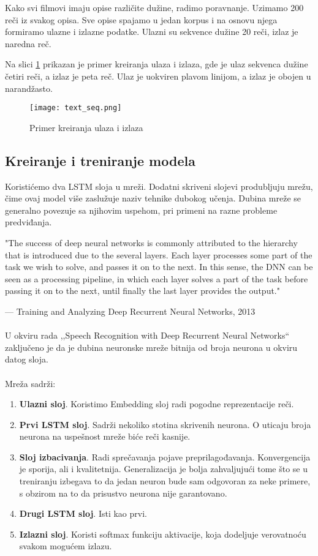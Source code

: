 \documentclass[a4paper]{article}
\begin{document}
Kako svi filmovi imaju opise različite dužine, radimo poravnanje. Uzimamo 200 reči iz svakog opisa. Sve opise spajamo u jedan korpus i na osnovu njega formiramo ulazne i izlazne podatke. Ulazni su sekvence dužine 20 reči, izlaz je naredna reč.

Na slici \ref{fig:text_seq} prikazan je primer kreiranja ulaza i izlaza, gde je ulaz sekvenca dužine četiri reči, a izlaz je peta reč. Ulaz je uokviren plavom linijom, a izlaz je obojen u narandžasto.


\begin{figure}[htp]
    \centering
    \texttt{[image: text\_seq.png]}
    \caption{Primer kreiranja ulaza i izlaza}
    \label{fig:text_seq}
\end{figure}



\subsection{Kreiranje i treniranje modela}

Koristićemo dva LSTM sloja u mreži. Dodatni skriveni slojevi produbljuju mrežu, čime ovaj model više zaslužuje naziv tehnike dubokog učenja. Dubina mreže se generalno povezuje sa njihovim uspehom, pri primeni na razne probleme predviđanja. 

"The success of deep neural networks is commonly attributed to the hierarchy that is introduced due to the several layers. Each layer processes some part of the task we wish to solve, and passes it on to the next. In this sense, the DNN can be seen as a processing pipeline, in which each layer solves a part of the task before passing it on to the next, until finally the last layer provides the output."

— Training and Analyzing Deep Recurrent Neural Networks, 2013  \cite{NIPS2013_5166}\\
\\
U okviru rada ,,Speech Recognition with Deep Recurrent Neural Networks`` \cite{graves2013speech} zaključeno je da je dubina neuronske mreže bitnija od broja neurona u okviru datog sloja.
\\
\\
Mreža sadrži:

\begin{enumerate}
    \item \textbf{Ulazni sloj}. Koristimo Embedding sloj radi pogodne reprezentacije reči. 
    \item \textbf{Prvi LSTM sloj}. Sadrži nekoliko stotina skrivenih neurona. O uticaju broja neurona na uspešnost mreže biće reči kasnije.
    \item \textbf{Sloj izbacivanja}. Radi sprečavanja pojave preprilagođavanja. Konvergencija je sporija, ali i kvalitetnija. Generalizacija je bolja zahvaljujući tome što se u treniranju izbegava to da jedan neuron bude sam odgovoran za neke primere, s obzirom na to da prisustvo neurona nije garantovano.
    \item \textbf{Drugi LSTM sloj}. Isti kao prvi.
    \item \textbf{Izlazni sloj}. Koristi softmax funkciju aktivacije, koja dodeljuje verovatnoću svakom mogućem izlazu. 
\end{enumerate}
\end{document}
